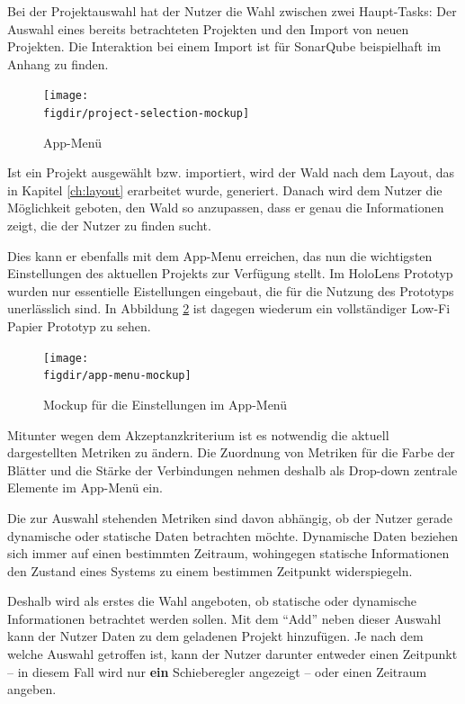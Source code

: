 Bei der Projektauswahl hat der Nutzer die Wahl zwischen zwei Haupt-Tasks: Der Auswahl eines bereits betrachteten Projekten und den Import von neuen Projekten. Die Interaktion bei einem Import ist für SonarQube beispielhaft im Anhang zu finden.

\begin{figure}[htb]
  \texttt{[image: \\figdir/project-selection-mockup]}
  \caption{App-Menü}
  \label{fig:project-selection-mockup}
\end{figure}

Ist ein Projekt ausgewählt bzw. importiert, wird der Wald nach dem Layout, das in Kapitel \ref{ch:layout} erarbeitet wurde, generiert. Danach wird dem Nutzer die Möglichkeit geboten, den Wald so anzupassen, dass er genau die Informationen zeigt, die der Nutzer zu finden sucht.

Dies kann er ebenfalls mit dem App-Menu erreichen, das nun die wichtigsten Einstellungen des aktuellen Projekts zur Verfügung stellt. Im HoloLens Prototyp wurden nur essentielle Eistellungen eingebaut, die für die Nutzung des Prototyps unerlässlich sind. In Abbildung \ref{fig:project-selection-mockup} ist dagegen wiederum ein vollständiger Low-Fi Papier Prototyp zu sehen.

\begin{figure}[htb]
  \texttt{[image: \\figdir/app-menu-mockup]}
  \caption{Mockup für die Einstellungen im App-Menü}
  \label{fig:project-selection-mockup}
\end{figure}

Mitunter wegen dem Akzeptanzkriterium  ist es notwendig die aktuell dargestellten Metriken zu ändern. Die Zuordnung von Metriken für die Farbe der Blätter und die Stärke der Verbindungen nehmen deshalb als Drop-down zentrale Elemente im App-Menü ein.

Die zur Auswahl stehenden Metriken sind davon abhängig, ob der Nutzer gerade dynamische oder statische Daten betrachten möchte. Dynamische Daten beziehen sich immer auf einen bestimmten Zeitraum, wohingegen statische Informationen den Zustand eines Systems zu einem bestimmen Zeitpunkt widerspiegeln.

Deshalb wird als erstes die Wahl angeboten, ob statische oder dynamische Informationen betrachtet werden sollen. Mit dem "`Add"' neben dieser Auswahl kann der Nutzer Daten zu dem geladenen Projekt hinzufügen. Je nach dem welche Auswahl getroffen ist, kann der Nutzer darunter entweder einen Zeitpunkt -- in diesem Fall wird nur \textbf{ein} Schieberegler angezeigt -- oder einen Zeitraum angeben.

